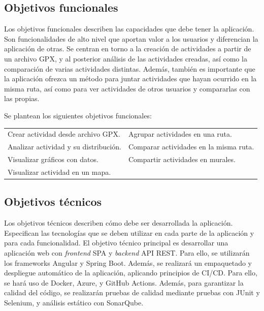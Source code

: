 \subsection{Objetivos funcionales} 
Los objetivos funcionales describen las capacidades que debe tener la aplicación. Son funcionalidades de alto nivel que aportan valor a los usuarios y diferencian la aplicación de otras. Se centran en torno a la creación de actividades a partir de un archivo GPX, y al posterior análisis de las actividades creadas, así como la comparación de varias actividades distintas. Además, también es importante que la aplicación ofrezca un método para juntar actividades que hayan ocurrido en la misma ruta, así como para ver actividades de otros usuarios y compararlas con las propias. 

\noindent Se plantean los siguientes objetivos funcionales:

\begin{table}[H]
\centering
\small
\begin{tabularx}{\textwidth}{@{} X X @{}}
\textbullet{} Crear actividad desde archivo GPX. & \textbullet{} Agrupar actividades en una ruta. \\ \addlinespace
\textbullet{} Analizar actividad y su distribución. & \textbullet{} Comparar actividades en la misma ruta. \\ \addlinespace
\textbullet{} Visualizar gráficos con datos. & \textbullet{} Compartir actividades en murales. \\ \addlinespace
\textbullet{} Visualizar actividad en un mapa. & \\ 
\end{tabularx}
\end{table}

\subsection{Objetivos técnicos}
Los objetivos técnicos describen cómo debe ser desarrollada la aplicación. Especifican las tecnologías que se deben utilizar en cada parte de la aplicación y para cada funcionalidad. El objetivo técnico principal es desarrollar una aplicación web con \textit{frontend} SPA y \textit{backend} API REST. Para ello, se utilizarán los frameworks Angular y Spring Boot. Además, se realizará un empaquetado y despliegue automático de la aplicación, aplicando principios de CI/CD. Para ello, se hará uso de Docker, Azure, y GitHub Actions. Además, para garantizar la calidad del código, se realizarán pruebas de calidad mediante pruebas con JUnit y Selenium, y análisis estático con SonarQube. 

